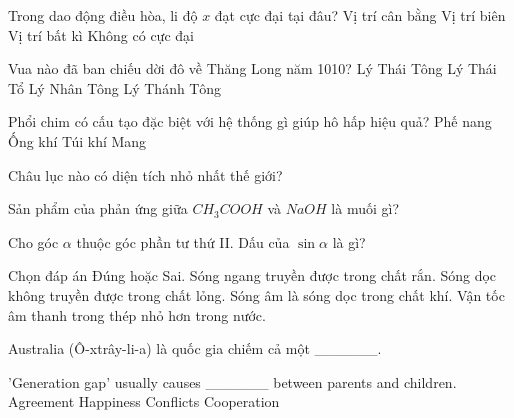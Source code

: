 \begin{ex}
    Trong dao động điều hòa, li độ $x$ đạt cực đại tại đâu?
    \choice
    {Vị trí cân bằng}
    {\True Vị trí biên}
    {Vị trí bất kì}
    {Không có cực đại}
\end{ex}
\begin{ex}
    Vua nào đã ban chiếu dời đô về Thăng Long năm 1010?
    \choice
    {Lý Thái Tông}
    {\True Lý Thái Tổ}
    {Lý Nhân Tông}
    {Lý Thánh Tông}
\end{ex}
\begin{ex}
    Phổi chim có cấu tạo đặc biệt với hệ thống gì giúp hô hấp hiệu quả?
    \choice
    {Phế nang}
    {\True Ống khí}
    {Túi khí}
    {Mang}
\end{ex}
\begin{ex}
    Châu lục nào có diện tích nhỏ nhất thế giới?
\end{ex}
\begin{ex}
    Sản phẩm của phản ứng giữa $CH_3COOH$ và $NaOH$ là muối gì?
\end{ex}
\begin{ex}
    Cho góc $\alpha$ thuộc góc phần tư thứ II. Dấu của $\sin \alpha$ là gì?
\end{ex}
\begin{ex}
    Chọn đáp án Đúng hoặc Sai.
    \choiceTF
    {\True Sóng ngang truyền được trong chất rắn.}
    {Sóng dọc không truyền được trong chất lỏng.}
    {\True Sóng âm là sóng dọc trong chất khí.}
    {Vận tốc âm thanh trong thép nhỏ hơn trong nước.}
\end{ex}
\begin{ex}
    Australia (Ô-xtrây-li-a) là quốc gia chiếm cả một ______.
\end{ex}
\begin{ex}
    'Generation gap' usually causes ______ between parents and children.
    \choice
    {Agreement}
    {Happiness}
    {\True Conflicts}
    {Cooperation}
\end{ex}
